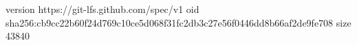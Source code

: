 version https://git-lfs.github.com/spec/v1
oid sha256:cb9cc22b60f24d769c10ce5d068f31fc2db3c27e56f0446dd8b66af2de9fe708
size 43840
